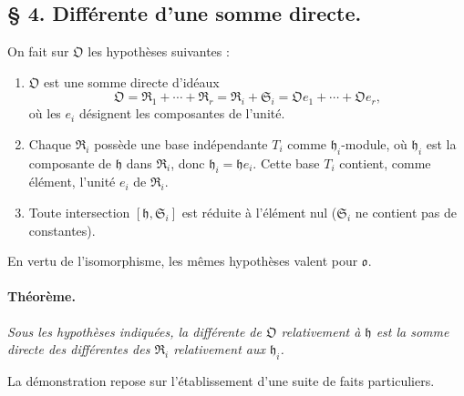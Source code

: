 \subsection*{\S{} 4. Différente d'une somme directe.}

On fait sur $\mathfrak O$ les hypothèses suivantes :

\begin{enumerate}
\item[(1)] $\mathfrak O$ est une somme directe d'idéaux
\[
\mathfrak O=\mathfrak R_1+\cdots+\mathfrak R_r
=\mathfrak R_i+\mathfrak S_i
=\mathfrak Oe_1+\cdots+\mathfrak Oe_r,
\]
où les $e_i$ désignent les composantes de l'unité.

\item[(2)] Chaque $\mathfrak R_i$ possède une base indépendante $T_i$ comme $\mathfrak h_i$-module, où $\mathfrak h_i$ est la composante de $\mathfrak h$ dans $\mathfrak R_i$, donc $\mathfrak h_i=\mathfrak h e_i$. Cette base $T_i$ contient, comme élément, l'unité $e_i$ de $\mathfrak R_i$.

\item[(3)] Toute intersection $[\mathfrak h,\mathfrak S_i]$ est réduite à l'élément nul ($\mathfrak S_i$ ne contient pas de constantes).
\end{enumerate}

En vertu de l'isomorphisme, les mêmes hypothèses valent pour $\mathfrak o$.

\paragraph{Théorème.}
\emph{Sous les hypothèses indiquées, la différente de $\mathfrak O$ relativement à $\mathfrak h$ est la somme directe des différentes des $\mathfrak R_i$ relativement aux $\mathfrak h_i$.}

La démonstration repose sur l'établissement d'une suite de faits particuliers.

